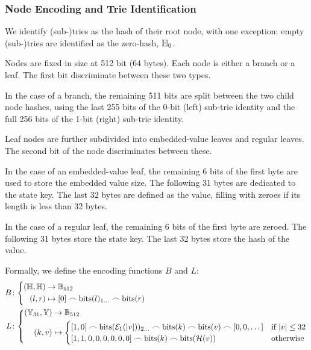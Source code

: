 \subsubsection{Node Encoding and Trie Identification}
We identify (sub-)tries as the hash of their root node, with one exception: empty (sub-)tries are identified as the zero-hash, $\mathbb{H}_0$.

Nodes are fixed in size at 512 bit (64 bytes). Each node is either a branch or a leaf. The first bit discriminate between these two types.

In the case of a branch, the remaining 511 bits are split between the two child node hashes, using the last 255 bits of the 0-bit (left) sub-trie identity and the full 256 bits of the 1-bit (right) sub-trie identity.

Leaf nodes are further subdivided into embedded-value leaves and regular leaves. The second bit of the node discriminates between these.

In the case of an embedded-value leaf, the remaining 6 bits of the first byte are used to store the embedded value size. The following 31 bytes are dedicated to the state key. The last 32 bytes are defined as the value, filling with zeroes if its length is less than 32 bytes.

In the case of a regular leaf, the remaining 6 bits of the first byte are zeroed. The following 31 bytes store the state key. The last 32 bytes store the hash of the value.

Formally, we define the encoding functions $B$ and $L$:
\begin{align}
  B&\colon\abracegroup{
    (\hash, \hash) &\to \bitstring_{512}\\
    (l, r) &\mapsto [0] \concat \text{bits}(l)_{1\dots} \concat \text{bits}(r)
  }\\
  L&\colon\abracegroup{
    (\blob_{31}, \blob) &\to \bitstring_{512}\\
    (k, v) &\mapsto \begin{cases}
      [1, 0] \concat \text{bits}(\se_1(\len{v}))_{2\dots} \concat \text{bits}(k) \concat \text{bits}(v) \concat [0, 0, \dots] &\when \len{v} \le 32\\
      [1, 1, 0, 0, 0, 0, 0, 0] \concat \text{bits}(k) \concat \text{bits}(\blake(v)) &\otherwise
    \end{cases}
  }
\end{align}

